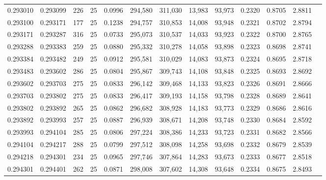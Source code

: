 \begin{tabular}{rrrrrrrrrrrrr}
0.293010 & 0.293099 &   226 &  25 &                                     0.0996 & 294,580 & 311,030 &  13,983 &  93,973 & 0.2320 & 0.8705 & 2.8811 \\
0.293100 & 0.293171 &   177 &  25 &                                     0.1238 & 294,757 & 310,853 &  14,008 &  93,948 & 0.2321 & 0.8702 & 2.8794 \\
0.293171 & 0.293287 &   316 &  25 &                                     0.0733 & 295,073 & 310,537 &  14,033 &  93,923 & 0.2322 & 0.8700 & 2.8765 \\
0.293288 & 0.293383 &   259 &  25 &                                     0.0880 & 295,332 & 310,278 &  14,058 &  93,898 & 0.2323 & 0.8698 & 2.8741 \\
0.293384 & 0.293482 &   249 &  25 &                                     0.0912 & 295,581 & 310,029 &  14,083 &  93,873 & 0.2324 & 0.8695 & 2.8718 \\
0.293483 & 0.293602 &   286 &  25 &                                     0.0804 & 295,867 & 309,743 &  14,108 &  93,848 & 0.2325 & 0.8693 & 2.8692 \\
0.293602 & 0.293703 &   275 &  25 &                                     0.0833 & 296,142 & 309,468 &  14,133 &  93,823 & 0.2326 & 0.8691 & 2.8666 \\
0.293703 & 0.293802 &   275 &  25 &                                     0.0833 & 296,417 & 309,193 &  14,158 &  93,798 & 0.2328 & 0.8689 & 2.8641 \\
0.293802 & 0.293892 &   265 &  25 &                                     0.0862 & 296,682 & 308,928 &  14,183 &  93,773 & 0.2329 & 0.8686 & 2.8616 \\
0.293892 & 0.293993 &   257 &  25 &                                     0.0887 & 296,939 & 308,671 &  14,208 &  93,748 & 0.2330 & 0.8684 & 2.8592 \\
0.293993 & 0.294104 &   285 &  25 &                                     0.0806 & 297,224 & 308,386 &  14,233 &  93,723 & 0.2331 & 0.8682 & 2.8566 \\
0.294104 & 0.294217 &   288 &  25 &                                     0.0799 & 297,512 & 308,098 &  14,258 &  93,698 & 0.2332 & 0.8679 & 2.8539 \\
0.294218 & 0.294301 &   234 &  25 &                                     0.0965 & 297,746 & 307,864 &  14,283 &  93,673 & 0.2333 & 0.8677 & 2.8518 \\
0.294301 & 0.294401 &   262 &  25 &                                     0.0871 & 298,008 & 307,602 &  14,308 &  93,648 & 0.2334 & 0.8675 & 2.8493 \\

\end{tabular}

